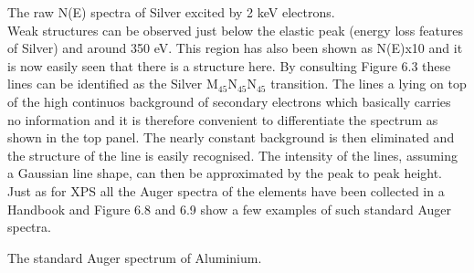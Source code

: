           \vspace{9.5cm}

           The raw N(E)  spectra  of  Silver
          excited by 2 keV electrons.\\

          Weak structures can be observed just below the  elastic  peak
          (energy loss features of Silver) and  around  350  eV.  This
          region has also been shown as N(E)x10 and it is  now  easily
          seen that there is a structure here.  By  consulting  Figure
          6.3  these  lines   can   be   identified   as   the   Silver
          M$_{45}$N$_{45}$N$_{45}$ transition. The lines  a  lying  on
          top of the high continuos background of secondary  electrons
          which basically carries no information and it  is  therefore
          convenient to differentiate the spectrum as shown in the top
          panel. The nearly constant background is then eliminated and
          the  structure  of  the  line  is  easily  recognised.   The
          intensity of the lines, assuming a Gaussian line shape,  can
          then be approximated by the peak to peak height. Just as for
          XPS  all  the  Auger  spectra  of  the  elements  have  been
          collected in a Handbook \cite{handbook} and Figure  6.8  and
          6.9 show a few examples of  such  standard  Auger  spectra.
          \newpage

          \vspace*{10.5cm}

                   The standard  Auger  spectrum  of
          Aluminium.\\


